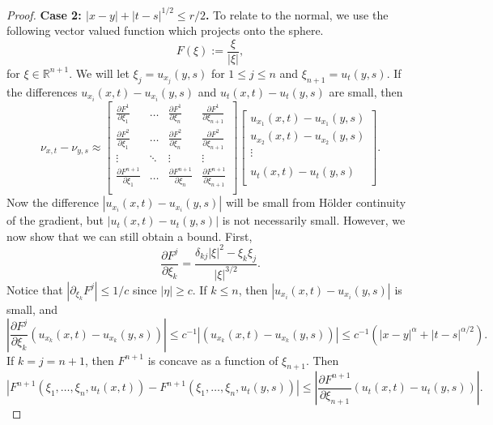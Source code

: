 \documentclass[10pt,a4paper]{amsart}
\begin{document}
\begin{proof}
   \noindent \textbf{Case 2: $|x-y|+|t-s|^{1/2}\leq r/2$.}
       To relate to the normal, we use the following vector valued function which projects onto the sphere. 
    \[
    F(\xi):= \frac{\xi}{|\xi|},
    \]
    for $\xi \in \mathbb{R}^{n+1}$. We will let $\xi_j =u_{x_j}(y,s)$ for $1\leq j \leq n$ and $\xi_{n+1}=u_t(y,s)$. If the differences $u_{x_i}(x,t)-u_{x_i}(y,s)$ and $u_t(x,t)-u_t(y,s)$ are small, then
    \[
     \nu_{x,t}-\nu_{y,s}\approx
     \begin{bmatrix}
         \frac{\partial F^1}{\partial \xi_1} & \dots &\frac{\partial F^1}{\partial \xi_n}
         & \frac{\partial F^1}{\partial \xi_{n+1}} \\
         \frac{\partial F^2}{\partial \xi_1} & \dots &\frac{\partial F^2}{\partial \xi_n}
         & \frac{\partial F^2}{\partial \xi_{n+1}} \\
          \vdots &\ddots &\vdots & \vdots\\
         \frac{\partial F^{n+1}}{\partial \xi_1} & \dots &\frac{\partial F^{n+1}}{\partial \xi_n}
         & \frac{\partial F^{n+1}}{\partial \xi_{n+1}} \\
     \end{bmatrix}
     \begin{bmatrix}
         u_{x_1}(x,t)-u_{x_1}(y,s) \\
         u_{x_2}(x,t)-u_{x_2}(y,s) \\
         \vdots \\
         \\
         u_{t}(x,t)-u_{t}(y,s) \\
     \end{bmatrix}.
    \]
    Now the difference $|u_{x_i}(x,t)-u_{x_i}(y,s)|$ will be small from H\"older continuity of the gradient, but $|u_t(x,t)-u_t(y,s)|$ is not necessarily small. However, we now show that we can still obtain a bound. First, 
    \[
    \frac{\partial F^j}{\partial \xi_k} = \frac{\delta_{kj}|\xi|^2 - \xi_k \xi_j}{|\xi|^{3/2}}. 
    \]
    Notice that $|\partial_{\xi_k} F^j|\leq 1/c$ since $|\eta| \geq c$. If $k \leq n$, then 
    $|u_{x_i}(x,t)-u_{x_i}(y,s)|$ is small, and 
    \[
     \left|\frac{\partial F^j}{\partial \xi_k} (u_{x_k}(x,t) -u_{x_k}(y,s))\right|
     \leq c^{-1}|(u_{x_k}(x,t) -u_{x_k}(y,s))| \leq c^{-1}(|x-y|^{\alpha} + |t-s|^{\alpha/2}). 
    \]
    If $k=j=n+1$, then $F^{n+1}$ is concave as a function of $\xi_{n+1}$. Then 
    \[
    |F^{n+1}(\xi_1,\ldots,\xi_n,u_t(x,t))- F^{n+1}(\xi_1,\ldots,\xi_n,u_t(y,s))|
    \leq \left|\frac{\partial F^{n+1}}{\partial \xi_{n+1}} (u_{t}(x,t) -u_{t}(y,s))\right|.
\]
\end{proof}
\end{document}
